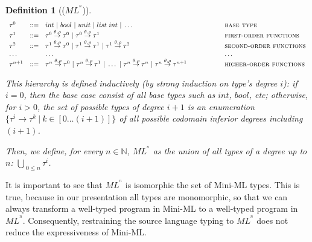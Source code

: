 \documentclass[a4paper,11pt,oneside]{article}
\theoremstyle{plain}
\newtheorem{definition}{Definition}[subsection]
\begin{document}
\begin{definition}[($ML^{^{n}}$)]
\begin{displaymath}
	\begin{array}{lll@{\hspace*{2cm}}l}
	\tau^0 & ::= & int~|~bool~|~unit~|~list~int~|~\dots~ & \textsc{base
          type} \\ \tau^1 & ::= & \tau^0 \stackrel{\theta, \rho}{\rightarrow}
        \tau^0 ~|~ \tau^0 \stackrel{\theta, \rho}{\rightarrow} \tau^1 &
        \textsc{first-order functions}\\ \tau^2 & ::= & \tau^1 \stackrel{\theta,
          \rho}{\rightarrow} \tau^0 ~|~ \tau^1 \stackrel{\theta,
          \rho}{\rightarrow} \tau^1 ~|~ \tau^1 \stackrel{\theta,
          \rho}{\rightarrow} \tau^2
	& \textsc{second-order functions} \\ \dots & & \dots & \dots
        \\ \tau^{n+1} & ::= & \tau^{n} \stackrel{\theta, \rho}{\rightarrow}
        \tau^0 ~|~ \tau^{n} \stackrel{\theta, \rho}{\rightarrow} \tau^1 ~|~
        \dots ~|~ \tau^{n} \stackrel{\theta, \rho}{\rightarrow} \tau^{n} ~|~
        \tau^{n} \stackrel{\theta, \rho}{\rightarrow}\tau^{n+1}
	& \textsc{higher-order functions} \\
	
	\end{array}
\end{displaymath}
\label{MLn-ty-d}

This hierarchy is defined inductively (by strong induction on type's degree
$i$): if $i=0$, then the base case consist of all base types such as $int$,
$bool$, etc; otherwise, for $i > 0$, the set of possible types of degree $i+1$
is an enumeration $\{\tau^{i} \rightarrow \tau^{k} ~|~ k \in [ 0 \dots (i+1) ]
\}$ of all possible codomain inferior degrees including $(i+1)$. 

Then, we define, for every $n \in \mathbb{N}$, $ML^{^{n}}$ as the union of all types of a degree up to $n$: $\bigcup_{~0 \leq n} \tau^i$.
\end{definition}

	It is important to see that $ML^{^{n}}$ is isomorphic the set of Mini-ML types.
This is true, because in our presentation all types are monomorphic, so that we can always transform a well-typed program in Mini-ML to a well-typed program in $ML^{^{n}}$. 
	Consequently, restraining the source language typing to $ML^{^{n}}$ does not
reduce the expressiveness of Mini-ML.
\end{document}
